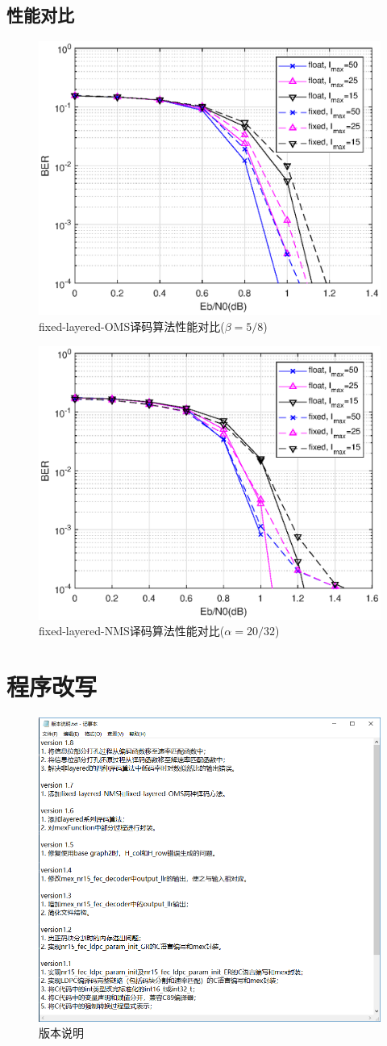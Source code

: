 \documentclass{article}
\begin{document}
\subsection{性能对比}
\begin{figure}[H]
	\centering
	\includegraphics[width = .6\textwidth]{foms.eps}
	\caption{fixed-layered-OMS译码算法性能对比($\beta=5/8$)}
\end{figure}
\begin{figure}[H]
	\centering
	\includegraphics[width = .6\textwidth]{fnms.eps}
	\caption{fixed-layered-NMS译码算法性能对比($\alpha=20/32$)}
\end{figure}

\section{程序改写}
\begin{figure}[H]
	\centering
	\includegraphics[width = .8\textwidth]{version.png}
	\caption{版本说明}
\end{figure}
\end{document}
